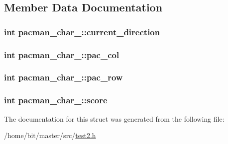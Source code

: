 \subsection{Member Data Documentation}
\hypertarget{structpacman__char__2_a30d19c18956c618a5cbee710d4c6f67f}{
\subsubsection[{current\-\_\-direction}]{\setlength{\rightskip}{0pt plus 5cm}int pacman\-\_\-char\-\_\-::current\-\_\-direction}}\label{structpacman__char__2_a30d19c18956c618a5cbee710d4c6f67f}
\hypertarget{structpacman__char__2_a8ff1ecd313b11ab1b48ac465d61ca5c9}{
\subsubsection[{pac\-\_\-col}]{\setlength{\rightskip}{0pt plus 5cm}int pacman\-\_\-char\-\_\-::pac\-\_\-col}}\label{structpacman__char__2_a8ff1ecd313b11ab1b48ac465d61ca5c9}
\hypertarget{structpacman__char__2_a7ea0aafb59b0e0a37cec73c92edbd3e5}{
\subsubsection[{pac\-\_\-row}]{\setlength{\rightskip}{0pt plus 5cm}int pacman\-\_\-char\-\_\-::pac\-\_\-row}}\label{structpacman__char__2_a7ea0aafb59b0e0a37cec73c92edbd3e5}
\hypertarget{structpacman__char__2_a9c37c17df5efa5fe759d6f01d04ee1af}{
\subsubsection[{score}]{\setlength{\rightskip}{0pt plus 5cm}int pacman\-\_\-char\-\_\-::score}}\label{structpacman__char__2_a9c37c17df5efa5fe759d6f01d04ee1af}


The documentation for this struct was generated from the following file\-:\begin{DoxyCompactItemize}
\item 
/home/bit/master/src/\hyperlink{test2_8h}{test2.\-h}\end{DoxyCompactItemize}
